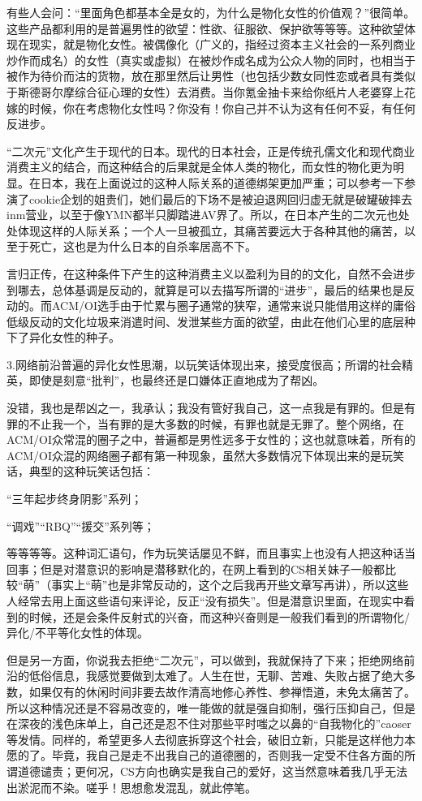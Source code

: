 \documentclass{ctexart}
\begin{document}
	有些人会问：“里面角色都基本全是女的，为什么是物化女性的价值观？”很简单。这些产品都利用的是普遍男性的欲望：性欲、征服欲、保护欲等等等。这种欲望体现在现实，就是物化女性。被偶像化（广义的，指经过资本主义社会的一系列商业炒作而成名）的女性（真实或虚拟）在被炒作成名成为公众人物的同时，也相当于被作为待价而沽的货物，放在那里然后让男性（也包括少数女同性恋或者具有类似于斯德哥尔摩综合征心理的女性）去消费。当你氪金抽卡来给你纸片人老婆穿上花嫁的时候，你在考虑物化女性吗？你没有！你自己并不认为这有任何不妥，有任何反进步。
	
	“二次元”文化产生于现代的日本。现代的日本社会，正是传统孔儒文化和现代商业消费主义的结合，而这种结合的后果就是全体人类的物化，而女性的物化更为明显。在日本，我在上面说过的这种人际关系的道德绑架更加严重；可以参考一下参演了cookie企划的姐贵们，她们最后的下场不是被迫退网回归虚无就是破罐破摔去inm营业，以至于像YMN都半只脚踏进AV界了。所以，在日本产生的二次元也处处体现这样的人际关系；一个人一旦被孤立，其痛苦要远大于各种其他的痛苦，以至于死亡，这也是为什么日本的自杀率居高不下。
	
	言归正传，在这种条件下产生的这种消费主义以盈利为目的的文化，自然不会进步到哪去，总体基调是反动的，就算是可以去描写所谓的“进步”，最后的结果也是反动的。而ACM/OI选手由于忙累与圈子通常的狭窄，通常来说只能借用这样的庸俗低级反动的文化垃圾来消遣时间、发泄某些方面的欲望，由此在他们心里的底层种下了异化女性的种子。
	
	3.网络前沿普遍的异化女性思潮，以玩笑话体现出来，接受度很高；所谓的社会精英，即使是刻意“批判”，也最终还是口嫌体正直地成为了帮凶。
	
	没错，我也是帮凶之一，我承认；我没有管好我自己，这一点我是有罪的。但是有罪的不止我一个，当有罪的是大多数的时候，有罪也就是无罪了。整个网络，在ACM/OI众常混的圈子之中，普遍都是男性远多于女性的；这也就意味着，所有的ACM/OI众混的网络圈子都有第一种现象，虽然大多数情况下体现出来的是玩笑话，典型的这种玩笑话包括：
	
	“三年起步终身阴影”系列；
	
	“调戏”“RBQ”“援交”系列等；
	
	等等等等。这种词汇语句，作为玩笑话屡见不鲜，而且事实上也没有人把这种话当回事；但是对潜意识的影响是潜移默化的，在网上看到的CS相关妹子一般都比较“萌”（事实上“萌”也是非常反动的，这个之后我再开些文章写再讲），所以这些人经常去用上面这些语句来评论，反正“没有损失”。但是潜意识里面，在现实中看到的时候，还是会条件反射式的兴奋，而这种兴奋则是一般我们看到的所谓物化/异化/不平等化女性的体现。
	
	但是另一方面，你说我去拒绝“二次元”，可以做到，我就保持了下来；拒绝网络前沿的低俗信息，我感觉要做到太难了。人生在世，无聊、苦难、失败占据了绝大多数，如果仅有的休闲时间非要去故作清高地修心养性、参禅悟道，未免太痛苦了。所以这种情况还是不容易改变的，唯一能做的就是强自抑制，强行压抑自己，但是在深夜的浅色床单上，自己还是忍不住对那些平时嗤之以鼻的“自我物化的”caoser等发情。同样的，希望更多人去彻底拆穿这个社会，破旧立新，只能是这样他力本愿的了。毕竟，我自己是走不出我自己的道德圈的，否则我一定受不住各方面的所谓道德谴责；更何况，CS方向也确实是我自己的爱好，这当然意味着我几乎无法出淤泥而不染。嗟乎！思想愈发混乱，就此停笔。
	
\end{document}
